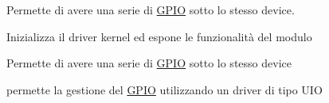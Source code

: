 Permette di avere una serie di \hyperlink{structGPIO}{G\+P\+IO} sotto lo stesso device.

Inizializza il driver kernel ed espone le funzionalità del modulo

Permette di avere una serie di \hyperlink{structGPIO}{G\+P\+IO} sotto lo stesso device

permette la gestione del \hyperlink{structGPIO}{G\+P\+IO} utilizzando un driver di tipo U\+IO 